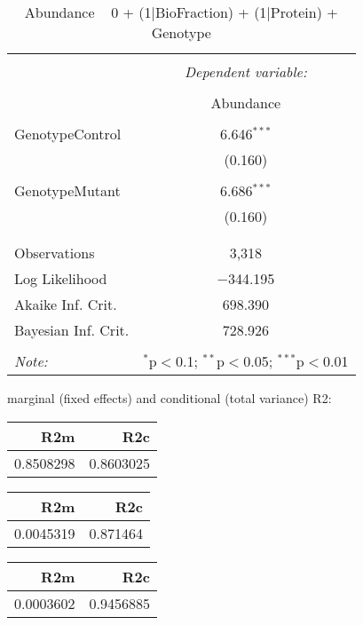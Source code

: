 \documentclass[11pt]{report}
\begin{document}
\begin{table}[!htbp] \centering 
  \caption{Abundance ~ 0 + (1|BioFraction) + (1|Protein) + Genotype} 
  \label{} 
\begin{tabular}{@{\extracolsep{5pt}}lc} 
\\[-1.8ex]\hline 
\hline \\[-1.8ex] 
 & \multicolumn{1}{c}{\textit{Dependent variable:}} \\ 
\cline{2-2} 
\\[-1.8ex] & Abundance \\ 
\hline \\[-1.8ex] 
 GenotypeControl & 6.646$^{***}$ \\ 
  & (0.160) \\ 
  & \\ 
 GenotypeMutant & 6.686$^{***}$ \\ 
  & (0.160) \\ 
  & \\ 
\hline \\[-1.8ex] 
Observations & 3,318 \\ 
Log Likelihood & $-$344.195 \\ 
Akaike Inf. Crit. & 698.390 \\ 
Bayesian Inf. Crit. & 728.926 \\ 
\hline 
\hline \\[-1.8ex] 
\textit{Note:}  & \multicolumn{1}{r}{$^{*}$p$<$0.1; $^{**}$p$<$0.05; $^{***}$p$<$0.01} \\ 
\end{tabular} 
\end{table} 
marginal (fixed effects) and conditional (total variance) R2:

\begin{tabular}{r|r}
\hline
R2m & R2c\\
\hline
0.8508298 & 0.8603025\\
\hline
\end{tabular}

\begin{tabular}{r|r}
\hline
R2m & R2c\\
\hline
0.0045319 & 0.871464\\
\hline
\end{tabular}

\begin{tabular}{r|r}
\hline
R2m & R2c\\
\hline
0.0003602 & 0.9456885\\
\hline
\end{tabular}
\end{document}
